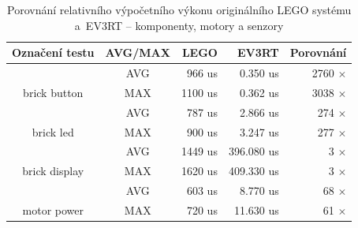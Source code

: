 \begin{table}[]
\centering
\caption{Porovnání relativního výpočetního výkonu originálního LEGO systému a~EV3RT -- \brick{} komponenty, motory a senzory}
\label{Benchmark-IO}
\begin{tabular}{@{}ccrrr@{}}
\toprule
Označení testu                                       & AVG/MAX                     & LEGO                               & EV3RT                                & Porovnání                                                    \\ \midrule
\multicolumn{1}{|c}{}                                & \cellcolor[HTML]{EFEFEF}AVG & \cellcolor[HTML]{EFEFEF}    966 us & \cellcolor[HTML]{EFEFEF}    0.350 us & \multicolumn{1}{r|}{\cellcolor[HTML]{EFEFEF}   2760 $\times$}  \\
\multicolumn{1}{|c}{\multirow{-2}{*}{brick button}}  & \cellcolor[HTML]{FFFFFF}MAX & \cellcolor[HTML]{FFFFFF}   1100 us & \cellcolor[HTML]{FFFFFF}    0.362 us & \multicolumn{1}{r|}{\cellcolor[HTML]{FFFFFF}   3038 $\times$}  \\ \midrule
\multicolumn{1}{|c}{}                                & \cellcolor[HTML]{EFEFEF}AVG & \cellcolor[HTML]{EFEFEF}    787 us & \cellcolor[HTML]{EFEFEF}    2.866 us & \multicolumn{1}{r|}{\cellcolor[HTML]{EFEFEF}    274 $\times$}  \\
\multicolumn{1}{|c}{\multirow{-2}{*}{brick led}}     & \cellcolor[HTML]{FFFFFF}MAX & \cellcolor[HTML]{FFFFFF}    900 us & \cellcolor[HTML]{FFFFFF}    3.247 us & \multicolumn{1}{r|}{\cellcolor[HTML]{FFFFFF}    277 $\times$}  \\ \midrule
\multicolumn{1}{|c}{}                                & \cellcolor[HTML]{EFEFEF}AVG & \cellcolor[HTML]{EFEFEF}   1449 us & \cellcolor[HTML]{EFEFEF}  396.080 us & \multicolumn{1}{r|}{\cellcolor[HTML]{EFEFEF}      3 $\times$}  \\
\multicolumn{1}{|c}{\multirow{-2}{*}{brick display}} & \cellcolor[HTML]{FFFFFF}MAX & \cellcolor[HTML]{FFFFFF}   1620 us & \cellcolor[HTML]{FFFFFF}  409.330 us & \multicolumn{1}{r|}{\cellcolor[HTML]{FFFFFF}      3 $\times$}  \\ \midrule
\multicolumn{1}{|c}{}                                & \cellcolor[HTML]{EFEFEF}AVG & \cellcolor[HTML]{EFEFEF}    603 us & \cellcolor[HTML]{EFEFEF}    8.770 us & \multicolumn{1}{r|}{\cellcolor[HTML]{EFEFEF}     68 $\times$}  \\
\multicolumn{1}{|c}{\multirow{-2}{*}{motor power}}   & \cellcolor[HTML]{FFFFFF}MAX & \cellcolor[HTML]{FFFFFF}    720 us & \cellcolor[HTML]{FFFFFF}   11.630 us & \multicolumn{1}{r|}{\cellcolor[HTML]{FFFFFF}     61 $\times$}  \\ \midrule

\end{tabular}
\end{table}
